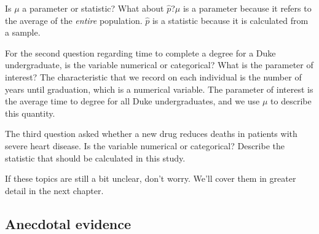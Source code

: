 \begin{examplewrap}
\begin{nexample}{Is $\mu$ a parameter or statistic? What about $\hat{p}$?}$\mu$ is a parameter because it refers to the average of the \emph{entire} population. $\hat{p}$ is a statistic because it is calculated from a sample.
\end{nexample}
\end{examplewrap}

\begin{examplewrap}
\begin{nexample}{For the second question regarding time to complete a degree for a Duke undergraduate, is the variable numerical or categorical? What is the parameter of interest?}
The characteristic that we record on each individual is the number of years until graduation, which is a numerical variable. The parameter of interest is the average time to degree for all Duke undergraduates, and we use $\mu$ to describe this quantity.
\end{nexample}
\end{examplewrap}

\begin{exercisewrap}
\begin{nexercise}The third question asked whether a new drug reduces deaths in patients with severe heart disease. Is the variable numerical or categorical? Describe the statistic that should be calculated in this study.\footnotemark
\end{nexercise}
\end{exercisewrap}

If these topics are still a bit unclear, don't worry. We'll cover them in greater detail in the next chapter.


\D{\newpage}

\subsection{Anecdotal evidence}
\label{anecdotalEvidenceSubsection}

